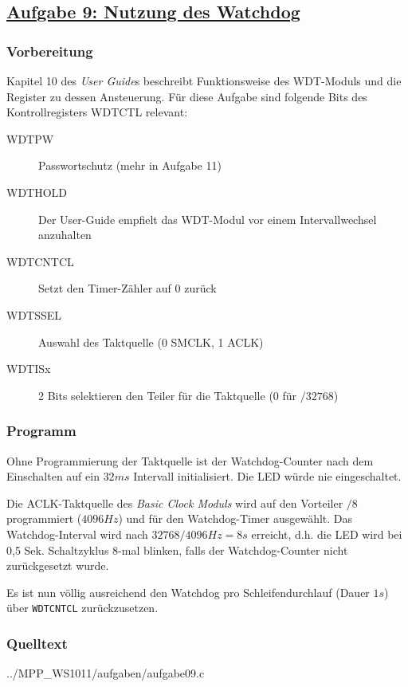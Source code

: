 \subsection
{\href{http://cst.mi.fu-berlin.de/intern/19606-P-MPP/Aufgaben/040301.html}
{Aufgabe 9: Nutzung des Watchdog}}

\subsubsection*{Vorbereitung}

Kapitel 10 des \emph{User Guide}s beschreibt Funktionsweise des
WDT-Moduls und die Register zu dessen Ansteuerung. Für diese Aufgabe
sind folgende Bits des Kontrollregisters WDTCTL relevant:

\begin{description}
    \item [WDTPW]    Passwortschutz (mehr in Aufgabe 11)
    \item [WDTHOLD]  Der User-Guide empfielt das WDT-Modul vor einem
Intervallwechsel anzuhalten
    \item [WDTCNTCL] Setzt den Timer-Zähler auf
0 zurück \item [WDTSSEL]  Auswahl des Taktquelle (0 SMCLK, 1 ACLK)
    \item [WDTISx]   2 Bits selektieren den Teiler für die Taktquelle (0 für
$/32768$) \end{description}

\subsubsection*{Programm}

Ohne Programmierung der Taktquelle ist der Watchdog-Counter nach dem
Einschalten auf ein $32 ms$ Intervall initialisiert. Die LED würde nie
eingeschaltet.

Die ACLK-Taktquelle des \emph{Basic Clock Moduls} wird auf den Vorteiler
$/8$ programmiert ($4096 Hz$) und für den Watchdog-Timer ausgewählt. Das
Watchdog-Interval wird nach $32768 / 4096 Hz = 8 s$ erreicht, d.h. die
LED wird bei 0,5 Sek. Schaltzyklus 8-mal blinken, falls der
Watchdog-Counter nicht zurückgesetzt wurde.

Es ist nun völlig ausreichend den Watchdog pro Schleifendurchlauf (Dauer
$1 s$) über \texttt{WDTCNTCL} zurückzusetzen.

\subsubsection*{Quelltext}


{../MPP_WS1011/aufgaben/aufgabe09.c}
